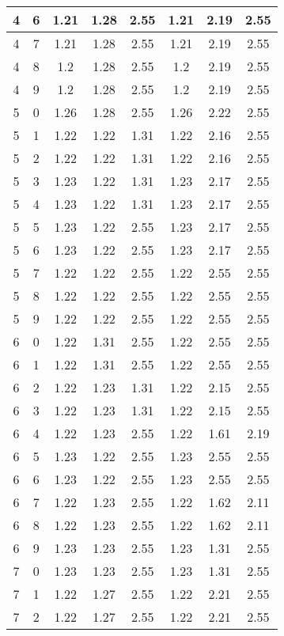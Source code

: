 \begin{longtable}{|c|c||c||c|c||c|c|c|}
	4 & 6 & 1.21 & 1.28 & 2.55 & 1.21 & 2.19 & 2.55 \\ \hline
	4 & 7 & 1.21 & 1.28 & 2.55 & 1.21 & 2.19 & 2.55 \\ \hline
	4 & 8 & 1.2 & 1.28 & 2.55 & 1.2 & 2.19 & 2.55 \\ \hline
	4 & 9 & 1.2 & 1.28 & 2.55 & 1.2 & 2.19 & 2.55 \\ \hline
	5 & 0 & 1.26 & 1.28 & 2.55 & 1.26 & 2.22 & 2.55 \\ \hline
	5 & 1 & 1.22 & 1.22 & 1.31 & 1.22 & 2.16 & 2.55 \\ \hline
	5 & 2 & 1.22 & 1.22 & 1.31 & 1.22 & 2.16 & 2.55 \\ \hline
	5 & 3 & 1.23 & 1.22 & 1.31 & 1.23 & 2.17 & 2.55 \\ \hline
	5 & 4 & 1.23 & 1.22 & 1.31 & 1.23 & 2.17 & 2.55 \\ \hline
	5 & 5 & 1.23 & 1.22 & 2.55 & 1.23 & 2.17 & 2.55 \\ \hline
	5 & 6 & 1.23 & 1.22 & 2.55 & 1.23 & 2.17 & 2.55 \\ \hline
	5 & 7 & 1.22 & 1.22 & 2.55 & 1.22 & 2.55 & 2.55 \\ \hline
	5 & 8 & 1.22 & 1.22 & 2.55 & 1.22 & 2.55 & 2.55 \\ \hline
	5 & 9 & 1.22 & 1.22 & 2.55 & 1.22 & 2.55 & 2.55 \\ \hline
	6 & 0 & 1.22 & 1.31 & 2.55 & 1.22 & 2.55 & 2.55 \\ \hline
	6 & 1 & 1.22 & 1.31 & 2.55 & 1.22 & 2.55 & 2.55 \\ \hline
	6 & 2 & 1.22 & 1.23 & 1.31 & 1.22 & 2.15 & 2.55 \\ \hline
	6 & 3 & 1.22 & 1.23 & 1.31 & 1.22 & 2.15 & 2.55 \\ \hline
	6 & 4 & 1.22 & 1.23 & 2.55 & 1.22 & 1.61 & 2.19 \\ \hline
	6 & 5 & 1.23 & 1.22 & 2.55 & 1.23 & 2.55 & 2.55 \\ \hline
	6 & 6 & 1.23 & 1.22 & 2.55 & 1.23 & 2.55 & 2.55 \\ \hline
	6 & 7 & 1.22 & 1.23 & 2.55 & 1.22 & 1.62 & 2.11 \\ \hline
	6 & 8 & 1.22 & 1.23 & 2.55 & 1.22 & 1.62 & 2.11 \\ \hline
	6 & 9 & 1.23 & 1.23 & 2.55 & 1.23 & 1.31 & 2.55 \\ \hline
	7 & 0 & 1.23 & 1.23 & 2.55 & 1.23 & 1.31 & 2.55 \\ \hline
	7 & 1 & 1.22 & 1.27 & 2.55 & 1.22 & 2.21 & 2.55 \\ \hline
	7 & 2 & 1.22 & 1.27 & 2.55 & 1.22 & 2.21 & 2.55 \\ \hline

\end{longtable}
